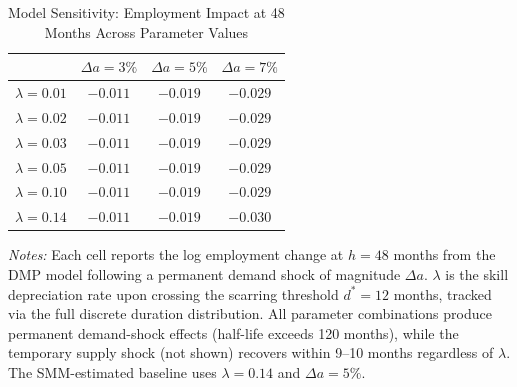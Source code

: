 \begin{table}[H]
\centering
\caption{Model Sensitivity: Employment Impact at 48 Months Across Parameter Values}
\begin{threeparttable}
\begin{tabular}{lccc}
\toprule
& $\Delta a = 3\%$ & $\Delta a = 5\%$ & $\Delta a = 7\%$ \\
\midrule
$\lambda = 0.01$ & $-0.011$ & $-0.019$ & $-0.029$ \\
$\lambda = 0.02$ & $-0.011$ & $-0.019$ & $-0.029$ \\
$\lambda = 0.03$ & $-0.011$ & $-0.019$ & $-0.029$ \\
$\lambda = 0.05$ & $-0.011$ & $-0.019$ & $-0.029$ \\
$\lambda = 0.10$ & $-0.011$ & $-0.019$ & $-0.029$ \\
$\lambda = 0.14$ & $-0.011$ & $-0.019$ & $-0.030$ \\
\bottomrule
\end{tabular}
\begin{tablenotes}[flushleft]
\small
\item \textit{Notes:} Each cell reports the log employment change at $h = 48$ months from the DMP model following a permanent demand shock of magnitude $\Delta a$. $\lambda$ is the skill depreciation rate upon crossing the scarring threshold $d^* = 12$ months, tracked via the full discrete duration distribution. All parameter combinations produce permanent demand-shock effects (half-life exceeds 120 months), while the temporary supply shock (not shown) recovers within 9--10 months regardless of $\lambda$. The SMM-estimated baseline uses $\lambda = 0.14$ and $\Delta a = 5\%$.
\end{tablenotes}
\end{threeparttable}
\label{tab:sensitivity}
\end{table}
